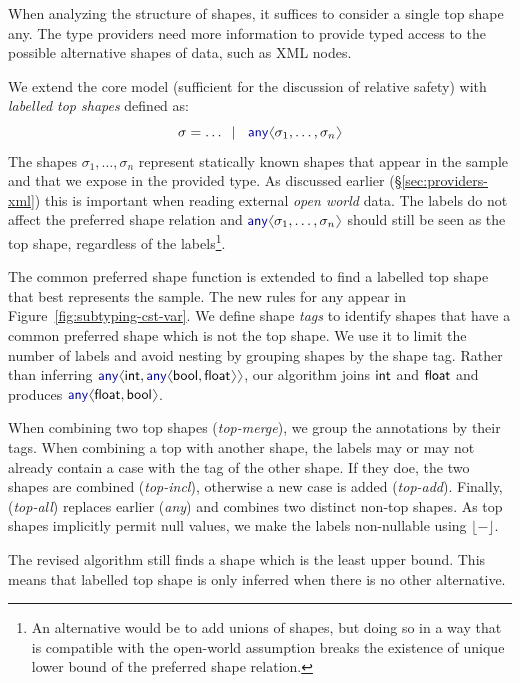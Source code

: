 \documentclass[10pt]{sigplanconf}
\newcommand{\langl}{\begin{picture}(4.5,7)
\put(1.1,2.5){\rotatebox{60}{\line(1,0){5.5}}}
\put(1.1,2.5){\rotatebox{300}{\line(1,0){5.5}}}
\end{picture}}
\newcommand{\rangl}{\begin{picture}(4.5,7)
\put(.9,2.5){\rotatebox{120}{\line(1,0){5.5}}}
\put(.9,2.5){\rotatebox{240}{\line(1,0){5.5}}}
\end{picture}}
\newcommand{\kvd}[1]{\textnormal{\textcolor{kvdclr}{\sffamily #1}}}
\newcommand{\ident}[1]{\textnormal{\sffamily #1}}
\newcommand{\lsep}[0]{\;\; | \;\;}
\newcommand{\dropopt}[1]{\lfloor#1\rfloor}
\begin{document}
When analyzing the structure of shapes, it suffices to consider a single top shape \kvd{any}.
The type providers need more information to provide typed access to the possible 
alternative shapes of data, such as XML nodes. 

We extend the core model (sufficient for the discussion of relative safety) with \emph{labelled top 
shapes} defined as:
% 
\begin{equation*}
\sigma = \ldots \lsep \kvd{any}\langl \sigma_1, \ldots, \sigma_n\rangl
\end{equation*}
%
The shapes $\sigma_1, \ldots, \sigma_n$ represent statically known shapes that appear in the
sample and that we expose in the provided type. As discussed earlier (\S\ref{sec:providers-xml})
this is important when reading external \emph{open world} data. The labels do not affect the 
preferred shape relation and $\kvd{any}\langl \sigma_1, \ldots, \sigma_n\rangl$ should still be
seen as the top shape, regardless of the labels\footnote{An alternative would be to add unions of 
shapes, but doing so in a way that is compatible with the open-world assumption breaks the 
existence of unique lower bound of the preferred shape relation.}.

The common preferred shape function is extended to find a labelled top shape that best represents 
the sample. The new rules for \kvd{any} appear in Figure~\ref{fig:subtyping-cst-var}. 
We define shape \emph{tags} to identify shapes that have a common preferred shape 
which is not the top shape. We use it to limit the number of labels and avoid nesting by grouping 
shapes by the shape tag. Rather than inferring $\kvd{any}\langl\ident{int}, \kvd{any}\langl\ident{bool}, \ident{float}\rangl\rangl$, 
our algorithm joins $\ident{int}$ and $\ident{float}$ and produces 
$\kvd{any}\langl\ident{float},\ident{bool}\rangl$. 

When combining two top shapes (\emph{top-merge}), we group the annotations by their tags.
When combining a top with another shape, the labels may or may not already contain a case with 
the tag of the other shape. If they doe, the two shapes are combined (\emph{top-incl}), otherwise 
a new case is added (\emph{top-add}). Finally, (\emph{top-all}) replaces earlier (\emph{any}) 
and combines two distinct non-top shapes. As top shapes implicitly permit \kvd{null} values,
we make the labels non-nullable using $\dropopt{-}$.

The revised algorithm still finds a shape which is the least upper bound. This means that 
labelled top shape is only inferred when there is no other alternative.
\end{document}
